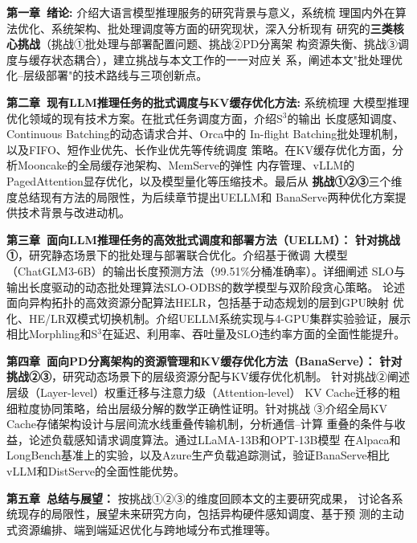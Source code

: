 \textbf{第一章\ 绪论: }介绍大语言模型推理服务的研究背景与意义，系统梳
理国内外在算法优化、系统架构、批处理调度等方面的研究现状，深入分析现有
研究的\textbf{三类核心挑战}（挑战①批处理与部署配置问题、挑战②PD分离架
构资源失衡、挑战③调度与缓存状态耦合），建立挑战与本文工作的一一对应关
系，阐述本文"批处理优化--层级部署"的技术路线与三项创新点。

\textbf{第二章\ 现有LLM推理任务的批式调度与KV缓存优化方法: }系统梳理
大模型推理优化领域的现有技术方案。在批式任务调度方面，介绍S$^3$的输出
长度感知调度、Continuous Batching的动态请求合并、Orca\cite{Orca}中的
In-flight Batching批处理机制，以及FIFO、短作业优先、长作业优先等传统调度
策略。在KV缓存优化方面，分析Mooncake的全局缓存池架构、MemServe的弹性
内存管理、vLLM的PagedAttention显存优化，以及模型量化等压缩技术。最后从
\textbf{挑战①②③}三个维度总结现有方法的局限性，为后续章节提出UELLM和
BanaServe两种优化方案提供技术背景与改进动机。

\textbf{第三章\ 面向LLM推理任务的高效批式调度和部署方法（UELLM）： }\textbf{针对挑战①}，研究静态场景下的批处理与部署联合优化。介绍基于微调
大模型（ChatGLM3-6B）的输出长度预测方法（99.51\%分桶准确率）。详细阐述
SLO与输出长度驱动的动态批处理算法SLO-ODBS的数学模型与双阶段贪心策略。
论述面向异构拓扑的高效资源分配算法HELR，包括基于动态规划的层到GPU映射
优化、HE/LR双模式切换机制。介绍UELLM系统实现与4-GPU集群实验验证，展示
相比Morphling和S$^3$在延迟、利用率、吞吐量及SLO违约率方面的全面性能提升。

\textbf{第四章\ 面向PD分离架构的资源管理和KV缓存优化方法（BanaServe）： }\textbf{针对挑战②③}，研究动态场景下的层级资源分配与KV缓存优化机制。
针对挑战②阐述层级（Layer-level）权重迁移与注意力级（Attention-level）
KV Cache迁移的粗细粒度协同策略，给出层级分解的数学正确性证明。针对挑战
③介绍全局KV Cache存储架构设计与层间流水线重叠传输机制，分析通信--计算
重叠的条件与收益，论述负载感知请求调度算法。通过LLaMA-13B和OPT-13B模型
在Alpaca和LongBench基准上的实验，以及Azure生产负载追踪测试，验证BanaServe相比vLLM和DistServe的全面性能优势。


\textbf{第五章\ 总结与展望： }按挑战①②③的维度回顾本文的主要研究成果，
讨论各系统现存的局限性，展望未来研究方向，包括异构硬件感知调度、基于预
测的主动式资源编排、端到端延迟优化与跨地域分布式推理等。

